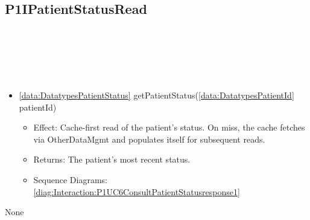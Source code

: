   \subsection{P1IPatientStatusRead}\label{int:InterfacesP1IPatientStatusRead}
    \begin{description}
      \item[Provided by:] \iconcomponent{}~
      \item[Required by:] \iconcomponent{}~ 
      \item[Operations:] ~
    \begin{itemize}[noitemsep,nolistsep,leftmargin=-.25cm]
      \item \textsf{\ref{data:DatatypesPatientStatus} getPatientStatus(\ref{data:DatatypesPatientId} patientId)}
        \begin{itemize}[noitemsep,nolistsep]
           \item Effect: Cache-first read of the patient's status. On miss, the cache fetches via OtherDataMgmt and populates itself for subsequent reads. 
           \item Returns: The patient's most recent status.
           \item Sequence Diagrams: \cref{diag:Interaction:P1UC6ConsultPatientStatusresponse1}
        \end{itemize}
    \end{itemize}
      \item[Diagrams:] None
    \end{description}

